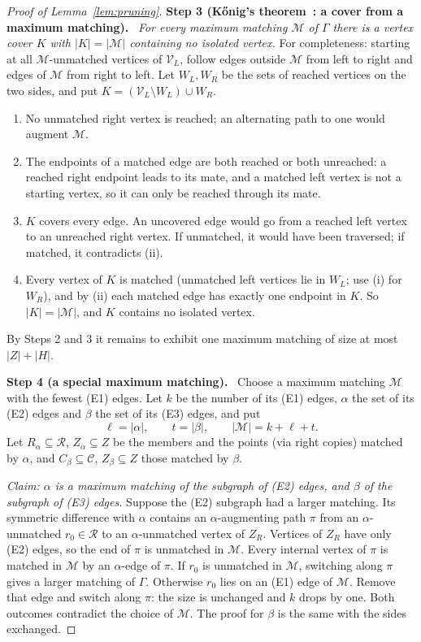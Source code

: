 \documentclass[11pt]{article}
\theoremstyle{remark}
\newcommand{\abs}[1]{\lvert #1\rvert}
\newcommand{\step}[1]{\par\medskip\noindent\textbf{Step #1.}\ }
\begin{document}
\begin{proof}[Proof of Lemma~\ref{lem:pruning}]
\step{3 (K\H{o}nig's theorem~\cite{konig1931}: a cover from a maximum matching)}
\emph{For every maximum matching $\mathcal M$ of $\Gamma$ there is a vertex
cover $K$ with $\abs K=\abs{\mathcal M}$ containing no isolated vertex.}
For completeness: starting at all $\mathcal M$-unmatched vertices of
$\mathcal V_L$, follow edges outside $\mathcal M$ from left to right and edges
of $\mathcal M$ from right to left. Let $W_L,W_R$ be the sets of reached
vertices on the two sides, and put
$K=(\mathcal V_L\setminus W_L)\cup W_R$.
\begin{enumerate}[label=\textup{(\roman*)},leftmargin=2.4em,itemsep=1pt]
\item No unmatched right vertex is reached; an alternating path to one would
augment $\mathcal M$.
\item The endpoints of a matched edge are both reached or both unreached: a
reached right endpoint leads to its mate, and a matched left vertex is not a
starting vertex, so it can only be reached through its mate.
\item $K$ covers every edge. An uncovered edge would go from a reached left
vertex to an unreached right vertex. If unmatched, it would have been
traversed; if matched, it contradicts (ii).
\item Every vertex of $K$ is matched (unmatched left vertices lie in $W_L$;
use (i) for $W_R$), and by (ii) each matched edge has exactly one endpoint in
$K$. So $\abs K=\abs{\mathcal M}$, and $K$ contains no isolated vertex.
\end{enumerate}
By Steps 2 and 3 it remains to exhibit one maximum matching of size at most
$\abs Z+\abs H$.

\step{4 (a special maximum matching)}
Choose a maximum matching $\mathcal M$ with the fewest (E1) edges. Let $k$ be
the number of its (E1) edges, $\alpha$ the set of its (E2) edges and $\beta$
the set of its (E3) edges, and put
\[
 \ell=\abs\alpha,\qquad t=\abs\beta,
 \qquad\abs{\mathcal M}=k+\ell+t.
\]
Let $R_\alpha\subseteq\mathcal R$, $Z_\alpha\subseteq Z$ be the members and
the points (via right copies) matched by $\alpha$, and
$C_\beta\subseteq\mathcal C$, $Z_\beta\subseteq Z$ those matched by $\beta$.

\emph{Claim: $\alpha$ is a maximum matching of the subgraph of \textup{(E2)}
edges, and $\beta$ of the subgraph of \textup{(E3)} edges.}
Suppose the (E2) subgraph had a larger matching. Its symmetric difference with
$\alpha$ contains an $\alpha$-augmenting path $\pi$ from an
$\alpha$-unmatched $r_0\in\mathcal R$ to an $\alpha$-unmatched vertex of
$Z_R$. Vertices of $Z_R$ have only (E2) edges, so the end of $\pi$ is
unmatched in $\mathcal M$. Every internal vertex of $\pi$ is matched in
$\mathcal M$ by an $\alpha$-edge of $\pi$. If $r_0$ is unmatched in
$\mathcal M$, switching along $\pi$ gives a larger matching of $\Gamma$.
Otherwise $r_0$ lies on an (E1) edge of $\mathcal M$. Remove that edge and
switch along $\pi$: the size is unchanged and $k$ drops by one. Both outcomes
contradict the choice of $\mathcal M$. The proof for $\beta$ is the same with
the sides exchanged.


\end{proof}
\end{document}
